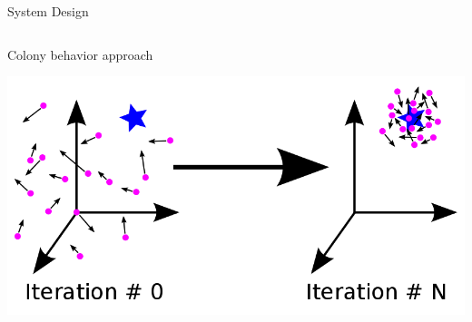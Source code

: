 \documentclass[9pt]{beamer}
\begin{document}
\begin{frame}{System Design}
\begin{columns}
\begin{column}{0.5\textwidth}
\begin{block}{Colony behavior approach}
                 \begin{center}
                     \includegraphics[width=\textwidth,trim={0cm 0cm 0cm 0cm},clip]{img/pso.png}
                 \end{center}
             \end{block} 
        \end{column}
    \end{columns}
\end{frame}
\end{document}
